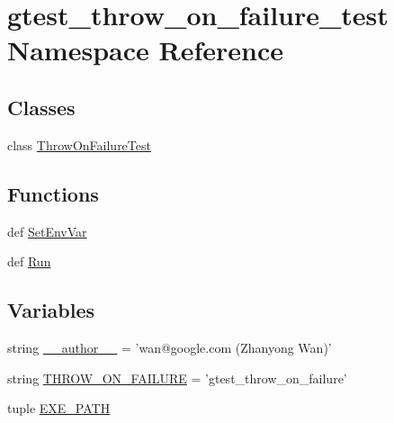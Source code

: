 \hypertarget{namespacegtest__throw__on__failure__test}{\section{gtest\-\_\-throw\-\_\-on\-\_\-failure\-\_\-test \-Namespace \-Reference}
\label{df/da6/namespacegtest__throw__on__failure__test}
}
\subsection*{\-Classes}
\begin{DoxyCompactItemize}
\item 
class \hyperlink{classgtest__throw__on__failure__test_1_1ThrowOnFailureTest}{\-Throw\-On\-Failure\-Test}
\end{DoxyCompactItemize}
\subsection*{\-Functions}
\begin{DoxyCompactItemize}
\item 
def \hyperlink{namespacegtest__throw__on__failure__test_a0f37f2b5ab8495a3d9390e6faca20723}{\-Set\-Env\-Var}
\item 
def \hyperlink{namespacegtest__throw__on__failure__test_ad031130c86bd0aa8eee37c09bc7a9000}{\-Run}
\end{DoxyCompactItemize}
\subsection*{\-Variables}
\begin{DoxyCompactItemize}
\item 
string \hyperlink{namespacegtest__throw__on__failure__test_a629d61dfe4da763164a4d1a2d85b0afd}{\-\_\-\-\_\-author\-\_\-\-\_\-} = 'wan@google.\-com (\-Zhanyong \-Wan)'
\item 
string \hyperlink{namespacegtest__throw__on__failure__test_a70be9ce46b509a0d0cc94803b7e37994}{\-T\-H\-R\-O\-W\-\_\-\-O\-N\-\_\-\-F\-A\-I\-L\-U\-R\-E} = 'gtest\-\_\-throw\-\_\-on\-\_\-failure'
\item 
tuple \hyperlink{namespacegtest__throw__on__failure__test_a216df3f485400b109390103528720888}{\-E\-X\-E\-\_\-\-P\-A\-T\-H}
\end{DoxyCompactItemize}


